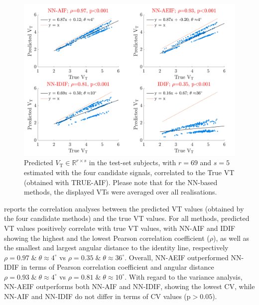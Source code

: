         \begin{figure}
            \centering
            
            \includegraphics[width=1.0\linewidth]{figures/arterial_input_function_correlation.png}
            
            \captionsetup{singlelinecheck=false}
            \caption{
                Predicted $V_{\mathrm{T}} \in \mathbb{R}^{r \times s}$ in the test-set subjects, with $r = 69$ and $s=5$ estimated with the four candidate signals, correlated to the True \gls{VT} (obtained with TRUE-\gls{AIF}). Please note that for the \gls{NN}-based methods, the displayed \glspl{VT} were averaged over all realisations.
            }
            \label{fig:a_bayesian_neural_network-based_method_for_the_extraction_of_a_metabolite_corrected_arterial_input_function_from_dynamic_pbr28_pet_appendix_results_correlation}
        \end{figure}
    
        
        reports the correlation analyses between the predicted \gls{VT} values (obtained by the four candidate methods) and the true \gls{VT} values. For all methods, predicted \gls{VT} values positively correlate with true \gls{VT} values, with \gls{NN}-\gls{AIF} and \gls{IDIF} showing the highest and the lowest Pearson correlation coefficient ($\rho$), as well as the smallest and largest angular distance to the identity line, respectively $\rho = 0.97 \; \& \;  \theta \approx 4^{\circ}$ vs $\rho = 0.35 \; \&  \; \theta \approx 36^{\circ}$. Overall, \gls{NN}-\gls{AE}\gls{IF} outperformed \gls{NN}-\gls{IDIF} in terms of Pearson correlation coefficient and angular distance $\rho = 0.93 \; \& \; \theta  \approx 4^{\circ}$ vs $\rho = 0.81 \; \&  \; \theta \approx 10^{\circ}$. With regard to the variance analysis, \gls{NN}-\gls{AE}\gls{IF} outperforms both \gls{NN}-\gls{AIF} and \gls{NN}-\gls{IDIF}, showing the lowest \gls{CV}, while \gls{NN}-\gls{AIF} and \gls{NN}-\gls{IDIF} do not differ in terms of \gls{CV} values (p$>0.05$).
    
